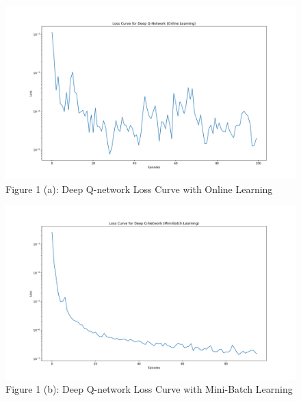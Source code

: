 \documentclass[12pt]{article}
\begin{document}
\clearpage
\begin{figure}
    \centering
    \includegraphics[width=15cm]{figures/1a.png}
    \caption*{Figure 1 (a): Deep Q-network Loss Curve with Online Learning}
\end{figure}
\begin{figure}
    \centering
    \includegraphics[width=15cm]{figures/1b.png}
    \caption*{Figure 1 (b): Deep Q-network Loss Curve with Mini-Batch Learning}
\end{figure}
\end{document}
